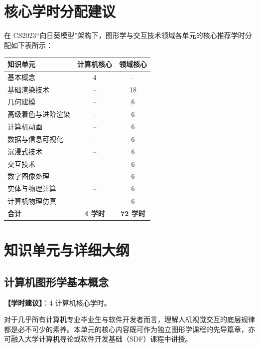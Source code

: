 \section{核心学时分配建议}

在 CS2023“向日葵模型”架构下，图形学与交互技术领域各单元的核心推荐学时分配如下表所示：

\begin{table}[H]
\centering
\setlength{\tabcolsep}{3.5pt}\fontsize{8pt}{9.6pt}\selectfont\begin{tabularx}{\columnwidth}{Y c c}
\toprule
\textbf{知识单元} & \textbf{计算机核心} & \textbf{领域核心} \\
\midrule
基本概念 & 4 & -- \\
基础渲染技术 & -- & 18 \\
几何建模 & -- & 6 \\
高级着色与进阶渲染 & -- & 6 \\
计算机动画 & -- & 6 \\
数据与信息可视化 & -- & 6 \\
沉浸式技术 & -- & 6 \\
交互技术 & -- & 6 \\
数字图像处理 & -- & 6 \\
实体与物理计算 & -- & 6 \\
计算机物理仿真 & -- & 6 \\
\midrule
\textbf{合计} & \textbf{4 学时} & \textbf{72 学时} \\
\bottomrule
\end{tabularx}
\end{table}

\section{知识单元与详细大纲}

\subsection{计算机图形学基本概念}
\textbf{【学时建议】}：4 计算机核心学时。

对于几乎所有计算机专业毕业生与软件开发者而言，理解人机视觉交互的底层规律都是必不可少的素养。本单元的核心内容既可作为独立图形学课程的先导篇章，亦可融入大学计算机导论或软件开发基础（SDF）课程中讲授。

